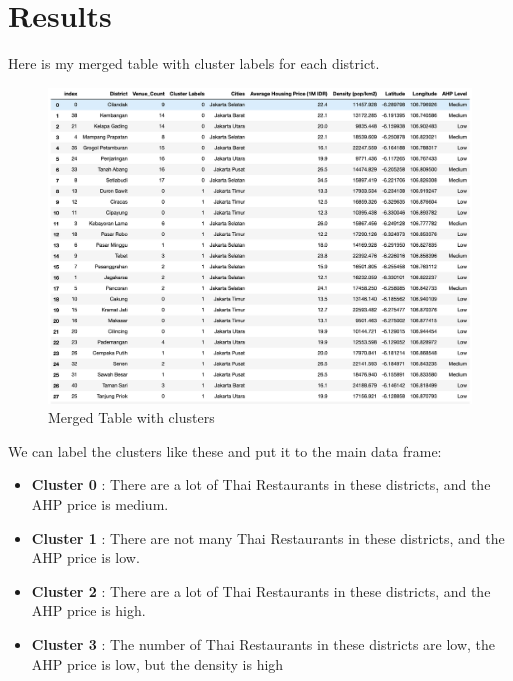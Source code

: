 \documentclass[12pt,a4paper]{article}
\begin{document}
\clearpage

\section{Results}

Here is my merged table with cluster labels for each district.

\begin{center}
    \begin{figure}[htp]
    \begin{center}
     \includegraphics[width=\textwidth]{fig/cluster_label}
    \end{center}
    \caption{Merged Table with clusters}
    \label{fig:cluster_label}
    \end{figure}
\end{center}

We can label the clusters like these and put it to the main data frame:
\begin{itemize}
\item \textbf{Cluster 0} : There are a lot of Thai Restaurants in these districts, and the AHP price is medium.
\item \textbf{Cluster 1} : There are not many Thai Restaurants in these districts, and the AHP price is low.
\item \textbf{Cluster 2} : There are a lot of Thai Restaurants in these districts, and the AHP price is high.
\item \textbf{Cluster 3} : The number of Thai Restaurants in these districts are low, the AHP price is low, but the density is high
\end{itemize}
\end{document}
